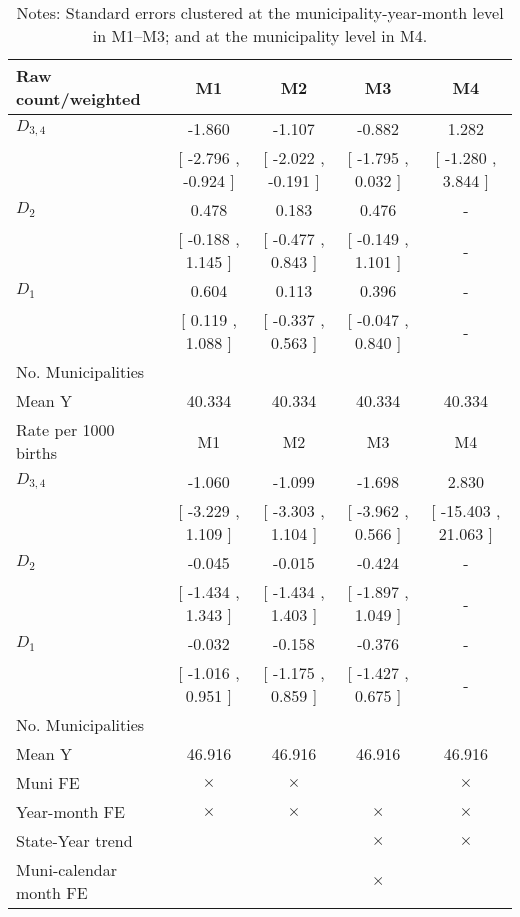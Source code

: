 \begin{table}[!ht]
\centering
\caption{Effects of Drought on lbw}\label{tab:twfe_lbw}
\fontsize{10pt}{12pt}\selectfont
\begin{tabular}{lcccc}
\toprule
  Raw count/weighted &\multicolumn{1}{c}{M1}&\multicolumn{1}{c}{M2}&\multicolumn{1}{c}{M3}&\multicolumn{1}{c}{M4} \\
\midrule
 $ D_{3,4} $ &    -1.860 &    -1.107 &    -0.882 &     1.282 \\ 
 & [    -2.796 ,    -0.924 ] & [    -2.022 ,    -0.191 ] & [    -1.795 ,     0.032 ] & [    -1.280 ,     3.844 ] \\ 
\addlinespace
 $ D_2 $ &     0.478 &     0.183 &     0.476 & - \\ 
 & [    -0.188 ,     1.145 ] & [    -0.477 ,     0.843 ] & [    -0.149 ,     1.101 ] & - \\ 
\addlinespace
 $ D_1 $ &     0.604 &     0.113 &     0.396 & - \\ 
 & [     0.119 ,     1.088 ] & [    -0.337 ,     0.563 ] & [    -0.047 ,     0.840 ] & - \\ 
\addlinespace
\midrule
  No. Municipalities &  &  &  &   \\
  Mean Y &    40.334 &    40.334 &    40.334 &    40.334  \\
\addlinespace
\midrule
  Rate per 1000 births &\multicolumn{1}{c}{M1}&\multicolumn{1}{c}{M2}&\multicolumn{1}{c}{M3}&\multicolumn{1}{c}{M4} \\
\midrule
 $ D_{3,4} $ &    -1.060 &    -1.099 &    -1.698 &     2.830 \\ 
 & [    -3.229 ,     1.109 ] & [    -3.303 ,     1.104 ] & [    -3.962 ,     0.566 ] & [   -15.403 ,    21.063 ] \\ 
\addlinespace
 $ D_2 $ &    -0.045 &    -0.015 &    -0.424 & - \\ 
 & [    -1.434 ,     1.343 ] & [    -1.434 ,     1.403 ] & [    -1.897 ,     1.049 ] & - \\ 
\addlinespace
 $ D_1 $ &    -0.032 &    -0.158 &    -0.376 & - \\ 
 & [    -1.016 ,     0.951 ] & [    -1.175 ,     0.859 ] & [    -1.427 ,     0.675 ] & - \\ 
\midrule
  No. Municipalities &  &  &  &   \\
  Mean Y &    46.916 &    46.916 &    46.916 &    46.916  \\
  Muni FE & $ \times $ & $ \times $ &  & $ \times $  \\
  Year-month FE & $ \times $ & $ \times $ & $ \times $ & $ \times $ \\
  State-Year trend &  &  & $ \times $ & $ \times $ \\
  Muni-calendar month FE &  &  & $ \times $ & \\
\bottomrule
\end{tabular}
\caption*{\footnotesize{Notes: Standard errors clustered at the municipality-year-month level in M1--M3; and at the municipality level in M4.}}
\end{table}
